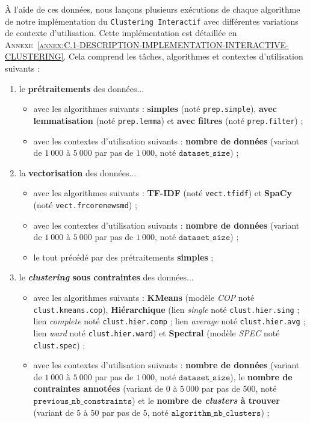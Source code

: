 			À l'aide de ces données, nous lançons plusieurs exécutions de chaque algorithme de notre implémentation du \texttt{Clustering Interactif} avec différentes variations de contexte d'utilisation.
			Cette implémentation est détaillée en \textsc{Annexe~\ref{annex:C.1-DESCRIPTION-IMPLEMENTATION-INTERACTIVE-CLUSTERING}}.
			Cela comprend les tâches, algorithmes et contextes d'utilisation suivants :
			\begin{enumerate}
				\item le \textbf{prétraitements} des données...
					\begin{itemize}
						\item avec les algorithmes suivants : \textbf{simples} (noté \texttt{prep.simple}), \textbf{avec lemmatisation} (noté \texttt{prep.lemma}) et \textbf{avec filtres} (noté \texttt{prep.filter}) ;
						\item avec les contextes d'utilisation suivants : \textbf{nombre de données} (variant de $1~000$ à $5~000$ par pas de $1~000$, noté $\texttt{dataset\_size}$) ;
					\end{itemize}
				\item la \textbf{vectorisation} des données...
					\begin{itemize}
						\item avec les algorithmes suivants : \textbf{TF-IDF} (noté \texttt{vect.tfidf}) et \textbf{SpaCy} (noté \texttt{vect.frcorenewsmd}) ;
						\item avec les contextes d'utilisation suivants : \textbf{nombre de données} (variant de $1~000$ à $5~000$ par pas de $1~000$, noté $\texttt{dataset\_size}$) ;
						\item le tout précédé par des prétraitements \textbf{simples} ;
					\end{itemize}
				\item le \textbf{\textit{clustering} sous contraintes} des données...
					\begin{itemize}
						\item avec les algorithmes suivants : \textbf{KMeans} (modèle \textit{COP} noté \texttt{clust.kmeans.cop}), \textbf{Hiérarchique} (lien \textit{single} noté \texttt{clust.hier.sing} ; lien \textit{complete} noté \texttt{clust.hier.comp} ; lien \textit{average} noté \texttt{clust.hier.avg} ; lien \textit{ward} noté \texttt{clust.hier.ward}) et \textbf{Spectral} (modèle \textit{SPEC} noté \texttt{clust.spec}) ;
						\item avec les contextes d'utilisation suivants : \textbf{nombre de données} (variant de $1~000$ à $5~000$ par pas de $1~000$, noté $\texttt{dataset\_size}$), le \textbf{nombre de contraintes annotées} (variant de $0$ à $5~000$ par pas de $500$, noté $\texttt{previous\_nb\_constraints}$) et le \textbf{nombre de \textit{clusters} à trouver} (variant de $5$ à $50$ par pas de $5$, noté $\texttt{algorithm\_nb\_clusters}$) ;

\end{itemize}
\end{enumerate}
